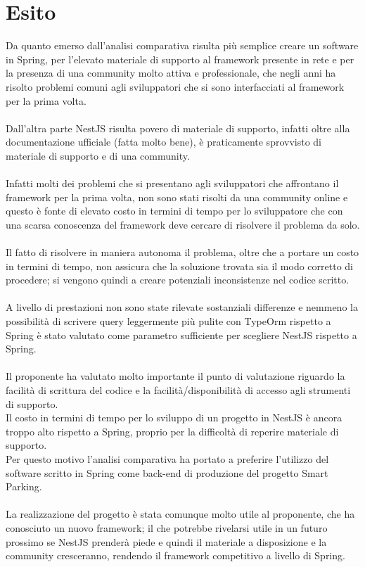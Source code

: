 \section{Esito}
Da quanto emerso dall'analisi comparativa risulta più semplice creare un software in Spring, per l'elevato materiale di
supporto al framework presente in rete e per la presenza di una community molto attiva e professionale, che negli
anni ha risolto problemi comuni agli sviluppatori che si sono interfacciati al framework per la prima volta. 
\\\\
Dall'altra parte NestJS risulta povero di materiale di supporto, infatti oltre alla documentazione ufficiale (fatta molto
bene), è praticamente sprovvisto di materiale di supporto e di una community.
\\\\
Infatti molti dei problemi che si presentano agli sviluppatori che affrontano il framework per la prima volta, non sono
stati risolti da una community online e questo è fonte di elevato costo in termini di tempo per lo sviluppatore che con 
una scarsa conoscenza del framework deve cercare di risolvere il problema da solo.
\\\\
Il fatto di risolvere in maniera autonoma il problema, oltre che a portare un costo in termini di tempo, non assicura 
che la soluzione trovata sia il modo corretto di procedere; si vengono quindi a creare potenziali inconsistenze nel codice
scritto.
\\\\
A livello di prestazioni non sono state rilevate sostanziali differenze e nemmeno la possibilità di scrivere query 
leggermente più pulite con TypeOrm rispetto a Spring è stato valutato come parametro sufficiente per scegliere 
NestJS rispetto a Spring.
\\\\
Il proponente ha valutato molto importante il punto di valutazione riguardo la facilità di scrittura del codice
e la facilità/disponibilità di accesso agli strumenti di supporto.
\\
Il costo in termini di tempo per lo sviluppo di un progetto in NestJS è ancora troppo alto rispetto a Spring, proprio
per la difficoltà di reperire materiale di supporto.
\\
Per questo motivo l'analisi comparativa ha portato a preferire l'utilizzo del software scritto in Spring come back-end
di produzione del progetto Smart Parking.
\\\\
La realizzazione del progetto è stata comunque molto utile al proponente, che ha conosciuto un nuovo
framework; il che potrebbe rivelarsi utile in un futuro prossimo se NestJS prenderà piede e quindi il materiale a 
disposizione e la community cresceranno, rendendo il framework competitivo a livello di Spring.